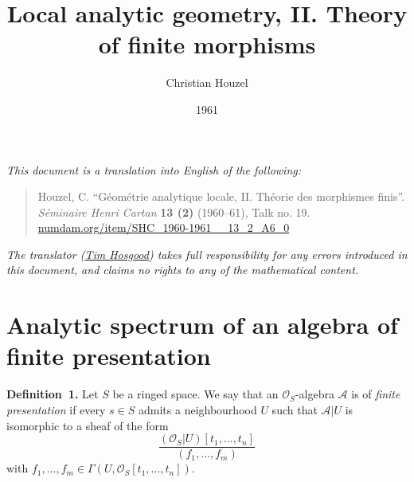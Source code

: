 \documentclass[british]{article}
\title{Local analytic geometry, II. Theory of finite morphisms}
\author{Christian Houzel}
\date{1961}
\newenvironment{rmenv}[1]
  {\phantomsection\par\smallskip\noindent\textbf{#1.}\rmfamily}
  {\par\smallskip}
\newcommand{\oldpage}[1]{\marginpar{\footnotesize$\Big\vert$ \textit{p.~#1}}}
\begin{document}
\maketitle
\thispagestyle{fancy}

\setcounter{footnote}{0}



\emph{This document is a translation into English of the following:}

\begin{quote}
Houzel, C. ``Géométrie analytique locale, II. Théorie des morphismes
finis''. \emph{Séminaire Henri Cartan} \textbf{13 (2)} (1960--61), Talk
no. 19.
\href{https://www.numdam.org/item/SHC_1960-1961__13_2_A6_0}{numdam.org/item/SHC\_1960-1961\_\_13\_2\_A6\_0}
\end{quote}

\emph{The translator (\href{https://thosgood.net}{Tim Hosgood}) takes
full responsibility for any errors introduced in this document, and
claims no rights to any of the mathematical content.}

\tableofcontents

\providecommand{\scr}[1]{{\mathscr{#1}}}
\renewcommand{\cal}[1]{{\mathcal{#1}}}
\renewcommand{\frak}[1]{{\mathfrak{#1}}}
\renewcommand{\geq}{\geqslant}
\renewcommand{\leq}{\leqslant}

\providecommand{\Cat}[1]{\mathsf{#1}}

\providecommand{\sh}[1]{\scr{#1}}
\providecommand{\OO}{\sh{O}}
\providecommand{\op}{\mathrm{op}}

\providecommand{\AA}{\sh{A}}
\providecommand{\BB}{\sh{B}}
\providecommand{\MM}{\sh{M}}
\providecommand{\NN}{\sh{N}}

\providecommand{\Hom}{\operatorname{Hom}}
\providecommand{\shHom}{\underline{\Hom}}

\providecommand{\Specan}[1]{\operatorname{Spec}_\mathrm{an}(#1)}
\providecommand{\Alg}[1]{{#1}\text{-}\Cat{Alg}}
\providecommand{\Mod}[1]{{#1}\text{-}\Cat{Mod}}

\section{Analytic spectrum of an algebra of finite
presentation}\label{section-1}

\oldpage{19-01}

\protect{}\label{definition-1}
\begin{rmenv}{Definition 1}
Let \(S\) be a ringed space. We say that an \({\mathscr{O}}_S\)-algebra
\({\mathscr{A}}\) is of \emph{finite presentation} if every \(s\in S\)
admits a neighbourhood \(U\) such that \({\mathscr{A}}|U\) is isomorphic
to a sheaf of the form \[
  \frac{({\mathscr{O}}_S|U)[t_1,\ldots,t_n]}{(f_1,\ldots,f_m)}
\] with \(f_1,\ldots,f_m\in\Gamma(U,{\mathscr{O}}_S[t_1,\ldots,t_n])\).

\end{rmenv}
\end{document}
